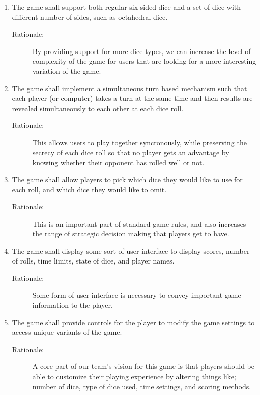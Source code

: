 \begin{enumerate}[label=R\arabic*, start=1, left=0pt]
    \item \label{R5} The game shall support both regular six-sided dice and a set of dice with different number of sides, such as octahedral dice.
    \begin{description}
        \item[Rationale:] By providing support for more dice types, we can increase the level of complexity of the game for users that are looking for a more interesting variation of the game.
    \end{description}

    \item \label{R6} The game shall implement a simultaneous turn based mechanism such that each player (or computer) takes a turn at the same time and then results are revealed simultaneously to each other at each dice roll.
    \begin{description}
        \item[Rationale:] This allows users to play together syncronously, while preserving the secrecy of each dice roll so that no player gets an advantage by knowing whether their opponent has rolled well or not.
    \end{description}

    \item \label{R7} The game shall allow players to pick which dice they would like to use for each roll, and which dice they would like to omit.
    \begin{description}
        \item[Rationale:] This is an important part of standard game rules, and also increases the range of strategic decision making that players get to have.
    \end{description}

    \item \label{R8} The game shall display some sort of user interface to display scores, number of rolls, time limits, state of dice, and player names.
    \begin{description}
        \item[Rationale:] Some form of user interface is necessary to convey important game information to the player.
    \end{description}

    \item \label{R9} The game shall provide controls for the player to modify the game settings to access unique variants of the game.
    \begin{description}
        \item[Rationale:] A core part of our team's vision for this game is that players should be able to customize their playing experience by altering things like; number of dice, type of dice used, time settings, and scoring methods.
    \end{description}


\end{enumerate}
